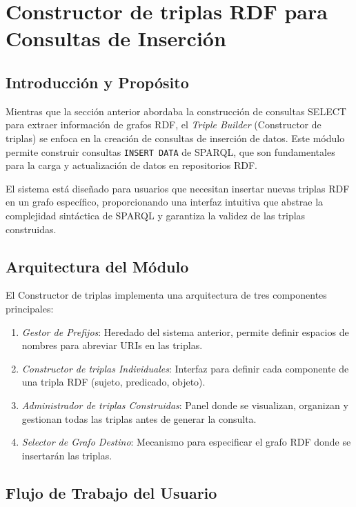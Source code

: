 \documentclass{article}
\begin{document}
\section{Constructor de triplas RDF para Consultas de Inserción}
\label{sec:triple-builder}

\subsection{Introducción y Propósito}
\label{subsec:triple-intro}

Mientras que la sección anterior abordaba la construcción de consultas SELECT para extraer información de grafos RDF, el \textit{Triple Builder} (Constructor de triplas) se enfoca en la creación de consultas de inserción de datos. Este módulo permite construir consultas \texttt{INSERT DATA} de SPARQL, que son fundamentales para la carga y actualización de datos en repositorios RDF. 

El sistema está diseñado para usuarios que necesitan insertar nuevas triplas RDF en un grafo específico, proporcionando una interfaz intuitiva que abstrae la complejidad sintáctica de SPARQL y garantiza la validez de las triplas construidas.

\subsection{Arquitectura del Módulo}
\label{subsec:triple-architecture}

El Constructor de triplas implementa una arquitectura de tres componentes principales:

\begin{enumerate}
    \item \textit{Gestor de Prefijos}: Heredado del sistema anterior, permite definir espacios de nombres para abreviar URIs en las triplas.
    \item \textit{Constructor de triplas Individuales}: Interfaz para definir cada componente de una tripla RDF (sujeto, predicado, objeto).
    \item \textit{Administrador de triplas Construidas}: Panel donde se visualizan, organizan y gestionan todas las triplas antes de generar la consulta.
    \item \textit{Selector de Grafo Destino}: Mecanismo para especificar el grafo RDF donde se insertarán las triplas.
\end{enumerate}

\subsection{Flujo de Trabajo del Usuario}
\label{subsec:triple-workflow}
\end{document}
